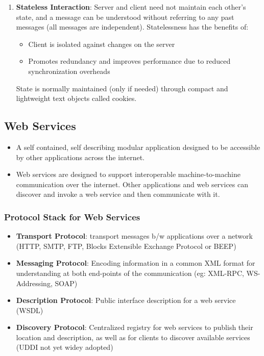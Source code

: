 \documentclass{article}
\begin{document}
\begin{itemize}
\begin{enumerate}
        \item \textbf{Stateless Interaction}: Server and client need not maintain each other's state, and a message can be understood without referring to any past messages (all messages are independent). Statelessness has the benefits of:
        \begin{itemize}
            \item Client is isolated against changes on the server
            
            \item Promotes redundancy and improves performance due to reduced synchronization overheads
        \end{itemize}
        State is normally maintained (only if needed) through compact and lightweight text objects called cookies. 
    \end{enumerate}
\end{itemize}

\subsection{Web Services}
\begin{itemize}
    \item A self contained, self describing modular application designed to be accessible by other applications across the internet.
    
    \item Web services are designed to support interoperable machine-to-machine communication over the internet. Other applications and web services can discover and invoke a web service and then communicate with it. 
\end{itemize}

\subsubsection{Protocol Stack for Web Services}
\begin{itemize}
    \item \textbf{Transport Protocol}: transport messages b/w applications over a network (HTTP, SMTP, FTP, Blocks Extensible Exchange Protocol or BEEP)
    
    \item \textbf{Messaging Protocol}: Encoding information in a common XML format for understanding at both end-points of the communication (eg: XML-RPC, WS-Addressing, SOAP)
    
    \item \textbf{Description Protocol}: Public interface description for a web service (WSDL)
    
    \item \textbf{Discovery Protocol}: Centralized registry for web services to publish their location and description, as well as for clients to discover available services (UDDI not yet widey adopted)
\end{itemize}
\end{document}
